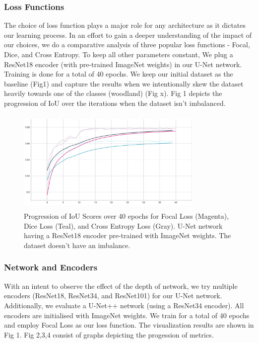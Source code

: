 \documentclass[conference]{IEEEtran}
\begin{document}
\subsubsection{Loss Functions} The choice of loss function plays a major role for any architecture as it dictates our learning process. In an effort to gain a deeper understanding of the impact of our choices, we do a comparative analysis of three popular loss functions - Focal, Dice, and Cross Entropy. To keep all other parameters constant, We plug a ResNet18 encoder (with pre-trained ImageNet weights) in our U-Net network. Training is done for a total of 40 epochs. We keep our initial dataset as the baseline (Fig1) and capture the results when we intentionally skew the dataset heavily towards one of the classes (woodland) (Fig x). Fig 1 depicts the progression of IoU over the iterations when the dataset isn't imbalanced.
\usepackage{float}

\begin{figure}[!h]
    \includegraphics[width=9cm, height=5cm]{images/roads-losses/three-losses-iou.png}
    \caption{Progression of IoU Scores over 40 epochs for Focal Loss (Magenta), Dice Loss (Teal), and Cross Entropy Loss (Gray). U-Net network having a ResNet18 encoder pre-trained with ImageNet weights. The dataset doesn't have an imbalance. }
\end{figure}


\subsubsection{Network and Encoders} With an intent to observe the effect of the depth of network, we try multiple encoders (ResNet18, ResNet34, and ResNet101) for our U-Net network. Additionally, we evaluate a U-Net++ network (using a ResNet34 encoder). All encoders are initialised with ImageNet weights. We train for a total of 40 epochs and employ Focal Loss as our loss function. The visualization results are shown in Fig 1. Fig 2,3,4 consist of graphs depicting the progession of metrics.
\end{document}
